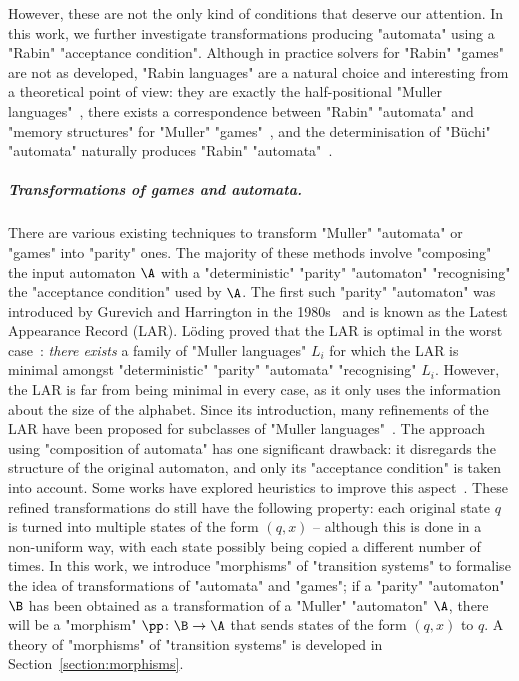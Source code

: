 \documentclass[10pt,a4paper]{amsart}
\begin{document}
However, these are not the only kind of conditions that deserve our attention. In this work, we further investigate transformations producing "automata" using a "Rabin" "acceptance condition". Although in practice solvers for "Rabin" "games" are not as developed, "Rabin languages" are a natural choice and interesting from a theoretical point of view: they are exactly the half-positional "Muller languages"~\cite{Zielonka1998infinite}, there exists a correspondence between "Rabin" "automata" and "memory structures" for "Muller" "games"~\cite{Casares2021Chromatic, CCL22SizeGFG}, and the determinisation of "B\"uchi" "automata" naturally produces "Rabin" "automata"~\cite{FKVW15Profile,Safra1988onthecomplexity, Schewe2009tighter}.


\subparagraph{Transformations of games and automata.} There are various existing techniques to transform "Muller" "automata" or "games" into "parity" ones. The majority of these methods involve "composing" the input automaton $\A$ with a "deterministic" "parity" "automaton" "recognising" the "acceptance condition" used by $\A$. The first such "parity" "automaton" was introduced by Gurevich and Harrington in the 1980s~\cite{Gurevich1982trees} and is known as the Latest Appearance Record (LAR).
L\"oding proved that the LAR is optimal in the worst case~\cite{Loding1999Optimal}: \textit{there exists} a family of "Muller languages" $L_i$
for which the LAR is minimal amongst "deterministic" "parity" "automata" "recognising" $L_i$.
However, the LAR is far from being minimal in every case, as it only uses the information about the size of the alphabet.
Since its introduction, many refinements of the LAR have been proposed for subclasses of "Muller languages"~\cite{Kretinski2017IAR,Loding1999Optimal}. 
The approach using "composition of automata" has one significant drawback: it disregards the structure of the original automaton, and only its "acceptance condition" is taken into account. Some works have explored heuristics to improve this aspect~\cite{KMWW21IARPreorders, MeyerSickert21OptimalPractical, RDP20PracticalParitizing}. These refined transformations do still have the following property: each original state $q$ is turned into multiple states of the form $(q, x)$ -- although this is done in a non-uniform way, with each state possibly being copied a different number of times.
In this work, we introduce "morphisms" of "transition systems" to formalise the idea of transformations of "automata" and "games"; if a "parity" "automaton" $\B$ has been obtained as a transformation of a "Muller" "automaton" $\A$, there will be a "morphism" $\pp\colon \B \to \A$ that sends states of the form $(q, x)$ to $q$. A theory of "morphisms" of "transition systems" is developed in Section~\ref{section:morphisms}.
\end{document}
